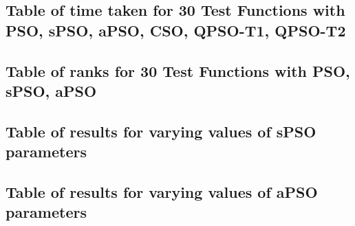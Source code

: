 \documentclass[12pt]{article}
\theoremstyle{definition}
\begin{document}
\newpage

\subsection{Table of time taken for 30 Test Functions with PSO, sPSO, aPSO, CSO, QPSO-T1, QPSO-T2}
\label{subsection:time table}
\renewcommand{\arraystretch}{0.6}
\begin{footnotesize}

\end{footnotesize}
\renewcommand{\arraystretch}{1}

\newpage

\subsection{Table of ranks for 30 Test Functions with PSO, sPSO, aPSO}
\label{subsection:comparesmall ranks table}
\renewcommand{\arraystretch}{0.6}
\begin{footnotesize}

\end{footnotesize}
\renewcommand{\arraystretch}{1}

\newpage

\subsection{Table of results for varying values of sPSO parameters}
\label{subsection:parameter spso}
\renewcommand{\arraystretch}{0.6}
\begin{footnotesize}

\end{footnotesize}
\renewcommand{\arraystretch}{1}

\newpage

\subsection{Table of results for varying values of aPSO parameters}
\label{subsection:parameter apso}
\renewcommand{\arraystretch}{0.6}
\begin{footnotesize}

\end{footnotesize}
\renewcommand{\arraystretch}{1}

\newpage



\singlespacing


\end{document}
